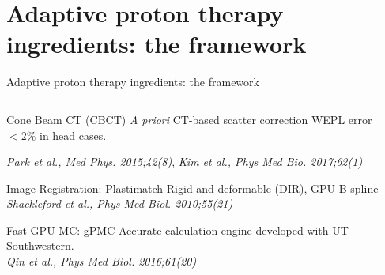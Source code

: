 \documentclass[pdf,dvipsnames,aspectratio=169]{beamer}
\begin{document}
\section{Adaptive proton therapy ingredients: the framework}
\begin{frame}[c]{Adaptive proton therapy ingredients: the framework}
    \begin{columns}[c]
        \begin{column}{0.48\textwidth}
            \vspace*{-2mm}
            {
                \begin{block}{Cone Beam CT (CBCT)}
                    \textit{A priori} CT-based scatter correction WEPL error $< 2\%$ in head cases.\\
                    {\begin{flushright}\scriptsize\textit{Park et al., Med Phys. 2015;42(8)}, \textit{Kim et al., Phys Med Bio. 2017;62(1)}\end{flushright}}
                \end{block}}
            {
                \begin{block}{Image Registration: Plastimatch}
                    Rigid and deformable (DIR), GPU B-spline\\
                    {\hfill\scriptsize\textit{Shackleford et al., Phys Med Biol. 2010;55(21)}}
                \end{block}}
            {
                \begin{block}{Fast GPU MC: gPMC}
                    Accurate calculation engine developed with UT Southwestern.\\
                    {\hfill\scriptsize\textit{Qin et al., Phys Med Biol. 2016;61(20)}}
                \end{block}}
        \end{column}
        \begin{column}{0.5\textwidth}
            \centering
            \texttt{[image: \{imgs/drawing]}.pdf}
        \end{column}
    \end{columns}
\end{frame}
\end{document}
